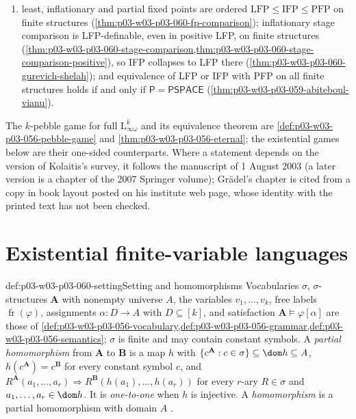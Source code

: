 \begin{enumerate}
      queries, with and without inequalities
      (\cref{thm:p03-w03-p03-060-datalog-systems}), and Datalog is equivalent
      to existential fixed-point logic on all structures
      (\cref{thm:p03-w03-p03-060-efp-datalog});
\item least, inflationary and partial fixed points are ordered
      \(\mathrm{LFP}\le\mathrm{IFP}\le\mathrm{PFP}\) on finite structures
      (\cref{thm:p03-w03-p03-060-fp-comparison}); inflationary stage
      comparison is LFP-definable, even in positive LFP, on finite
      structures (\cref{thm:p03-w03-p03-060-stage-comparison,thm:p03-w03-p03-060-stage-comparison-positive}),
      so IFP collapses to
      LFP there (\cref{thm:p03-w03-p03-060-gurevich-shelah}); and
      equivalence of LFP or IFP with PFP on all finite structures holds
      if and only if \(\mathsf P=\mathsf{PSPACE}\)
      (\cref{thm:p03-w03-p03-059-abiteboul-vianu}).
\end{enumerate}
The \(k\)-pebble game for full \(\mathrm{L}^k_{\infty\omega}\) and its
equivalence theorem are \cref{def:p03-w03-p03-056-pebble-game} and
\cref{thm:p03-w03-p03-056-eternal}; the existential games below are their
one-sided counterparts. Where a statement depends on the version of
Kolaitis's survey, it follows the manuscript of 1 August 2003 (a later
version is a chapter of the 2007 Springer volume); Gr\"adel's chapter is
cited from a copy in book layout posted on his institute web page, whose identity with the
printed text has not been checked.

\section{Existential finite-variable languages}
\label{sec:p03-w03-p03-060-languages}

\begin{hbconvention}{def:p03-w03-p03-060-setting}{Setting and homomorphisms}
Vocabularies \(\sigma\), \(\sigma\)-structures \(\mathbf A\) with nonempty
universe \(A\), the variables \(v_1,\ldots,v_k\), free labels
\(\operatorname{fr}(\varphi)\), assignments \(\alpha\colon D\to A\) with
\(D\subseteq[k]\), and satisfaction \(\mathbf A\models\varphi[\alpha]\) are
those of
\cref{def:p03-w03-p03-056-vocabulary,def:p03-w03-p03-056-grammar,def:p03-w03-p03-056-semantics};
\(\sigma\) is finite and may contain constant symbols. A \emph{partial
homomorphism} from \(\mathbf A\) to \(\mathbf B\) is a map \(h\) with
\(\{c^{\mathbf A}:c\in\sigma\}\subseteq\dom h\subseteq A\),
\(h(c^{\mathbf A})=c^{\mathbf B}\) for every constant symbol \(c\), and
\(R^{\mathbf A}(a_1,\ldots,a_r)\Rightarrow R^{\mathbf B}(h(a_1),\ldots,h(a_r))\)
for every \(r\)-ary \(R\in\sigma\) and \(a_1,\ldots,a_r\in\dom h\). It is
\emph{one-to-one} when \(h\) is injective. A \emph{homomorphism} is a
partial homomorphism with domain \(A\) \cite[Def.~6.22,
p.~44]{Kolaitis2003ExpressivePowerNotes}.
\end{hbconvention}

